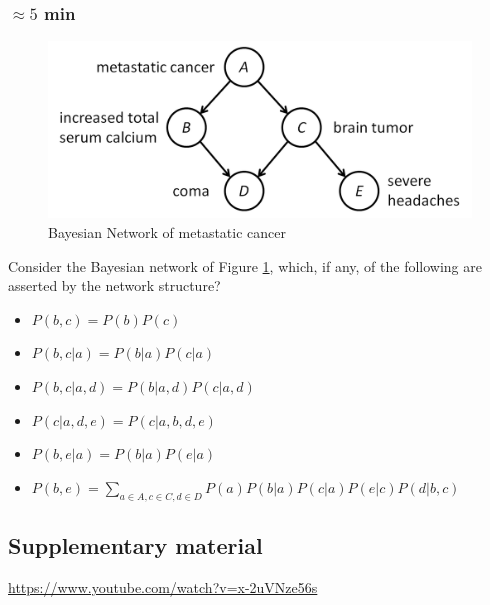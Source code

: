 \documentclass[a4paper, 10pt]{article}
\begin{document}
\subsubsection{$\approx 5$ min}
\begin{figure}[H]
    \centering
    \includegraphics[width=1.\textwidth]{figures/pearl-bn-example.png}
    \caption{Bayesian Network of metastatic cancer}
    \label{fig:pearl-b-net}
\end{figure}
Consider the Bayesian network of Figure \ref{fig:pearl-b-net}, which, if any, of the following are asserted by the network structure?
\begin{itemize}
    \item $P(b, c) = P(b)P(c)$
    \item $P(b, c|a) = P(b|a)P(c|a)$
    \item $P(b, c| a, d) = P(b|a, d) P(c|a, d)$
    \item $P(c|a, d, e) = P(c|a, b, d, e)$
    \item $P(b, e|a) = P(b|a)P(e|a)$
    \item $P(b, e) = \sum_{a \in A, c \in C, d \in D} P(a) P(b|a) P(c|a) P(e|c) P(d|b, c)$
\end{itemize}

   \subsection{Supplementary material}
   \url{https://www.youtube.com/watch?v=x-2uVNze56s}
   
 
   
   
\end{document}
